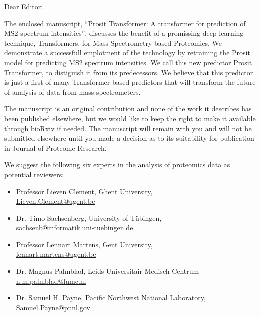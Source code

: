\documentclass[a4paper]{letter}
\begin{document}
\begin{letter}{}
\vspace*{-5.0cm}

\opening{Dear Editor:}


 The enclosed manuscript, ``Prosit Transformer: A transformer for prediction of MS2 spectrum intensities'', discusses the benefit of a promissing deep learning technique, Transformers, for Mass Spectrometry-based Proteomics. We demonstrate a successfull emplotment of the technology by retraining the Prosit model for predicting MS2 spectrum intensities. We call this new predictor Prosit Transformer, to distiguish it from its predecessors. We believe that this predictor is just a first of many Transformer-based predictors that will transform the future of analysis of data from mass spectrometers.
 
The manuscript is an original contribution and none of the work it describes has been published elsewhere, but we would like to keep the right to make it available through bioRxiv if needed. The manuscript will remain with you and will not be submitted elsewhere until you made a decision as to its suitability
for publication in Journal of Proteome Research.

We suggest the following six experts in the analysis of proteomics data as
potential reviewers:

\begin{itemize}

\item Professor Lieven Clement,
Ghent University, \\
\url{Lieven.Clement@ugent.be}

\item Dr. Timo Sachsenberg,
University of T\"{u}bingen,\\
\url{sachsenb@informatik.uni-tuebingen.de}

\item Professor Lennart Martens,
Gent University, \\
\url{lennart.martens@ugent.be}


\item Dr. Magnus Palmblad,
Leids Universitair Medisch Centrum\\
\url{n.m.palmblad@lumc.nl}



\item Dr. Samuel H. Payne, Pacific Northwest National Laboratory, \\
\url{Samuel.Payne@pnnl.gov}


\end{itemize}
\end{letter}
\end{document}
